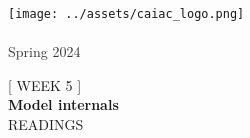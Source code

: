 \documentclass[12pt]{article}
\begin{document}

\definecolor{primaryColor}{HTML}{
    
}
\definecolor{primaryFaded}{HTML}{
    
}


\thispagestyle{empty} %
\begin{center}
    \texttt{[image: ../assets/caiac\_logo.png]}\\
    \vspace{0.5em}
    {\Large \textcolor[HTML]{333333}{}}\\
    \vspace{0.5em}
    {\textcolor[HTML]{333333}{Spring 2024}}
    \end{center}

\vspace{8em}

\begin{center}
    [ WEEK 5 ]\\
    \vspace{0.7em}
    {\Huge \textbf{Model internals}}\\
    \vspace{0.7em}
    \uppercase{READINGS}
\end{center}

\vfill  %
\begin{center}
\begin{minipage}{0.8\textwidth}  %
\centering
\end{minipage}
\end{center}

\vspace{2em}  %
\end{document}
